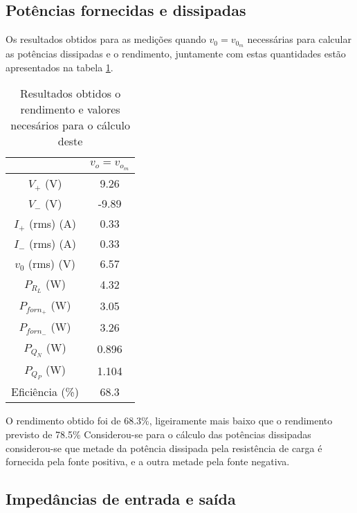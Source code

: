 \documentclass[%
  reprint,
  nofootinbib,
  amsmath,amssymb,
  aps,
  10pt,
  a4paper
]{revtex4-1}
\begin{document}
\subsection{Potências fornecidas e dissipadas}
Os resultados obtidos para as medições quando $v_0=v_{0_m}$ necessárias para calcular as potências dissipadas e o rendimento, juntamente com estas quantidades estão apresentados na tabela \ref{tab:fixe}.
\begin{table}[h]
\begin{tabular}{c|c}
                  & $v_{o}=v_{o_m}$ \\ \hline
$V_{+}$ (V)       & 9.26            \\ \hline
$V_{-}$ (V)       & -9.89           \\ \hline
$I_{+}$ (rms) (A) & 0.33            \\ \hline
$I_{-}$ (rms) (A) & 0.33            \\ \hline
$v_{0}$ (rms) (V) & 6.57            \\ \hline
$P_{R_L}$ (W)     & 4.32            \\ \hline
$P_{forn_+}$ (W)  & 3.05            \\ \hline
$P_{forn_-}$ (W)  & 3.26           \\ \hline
$P_{Q_N}$ (W)     & 0.896           \\ \hline
$P_{Q_P}$ (W)     & 1.104           \\ \hline
Eficiência (\%)   & 68.3          
\end{tabular}
\caption{Resultados obtidos o rendimento e valores necesários para o cálculo deste}
\label{tab:fixe}
\end{table}
O rendimento obtido foi de 68.3\%, ligeiramente mais baixo que o rendimento previsto de 78.5\%
Considerou-se para o cálculo das potências dissipadas considerou-se que metade da potência dissipada pela resistência  de carga é fornecida pela fonte positiva, e a outra metade pela fonte negativa.

\subsection{Impedâncias de entrada e saída}
\end{document}
